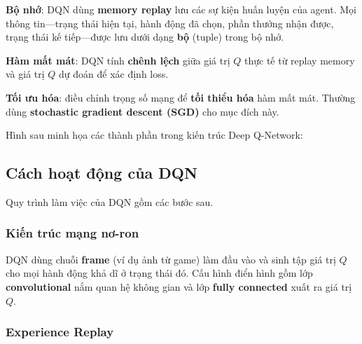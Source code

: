 \begin{phuongphap}[title={Bộ nhớ (Memory)}]
\textbf{Bộ nhớ}: DQN dùng \textbf{memory replay} lưu các sự kiện huấn luyện của agent.
Mọi thông tin---trạng thái hiện tại, hành động đã chọn, phần thưởng nhận được, trạng thái kế tiếp---được lưu dưới dạng \textbf{bộ} (tuple) trong bộ nhớ.
\end{phuongphap}

\begin{phuongphap}[title={Hàm mất mát (Loss Function)}]
\textbf{Hàm mất mát}: DQN tính \textbf{chênh lệch} giữa giá trị $Q$ thực tế từ replay memory và giá trị $Q$ dự đoán để xác định loss.
\end{phuongphap}

\begin{phuongphap}[title={Tối ưu hóa (Optimization)}]
\textbf{Tối ưu hóa}: điều chỉnh trọng số mạng để \textbf{tối thiểu hóa} hàm mất mát.
Thường dùng \textbf{stochastic gradient descent (SGD)} cho mục đích này.
\end{phuongphap}

\begin{vidu}[title={Sơ đồ kiến trúc DQN}]
Hình sau minh họa các thành phần trong kiến trúc Deep Q-Network:
\end{vidu}


\subsection{Cách hoạt động của DQN}

\begin{phuongphap}[title={Các bước vận hành}]
Quy trình làm việc của DQN gồm các bước sau.
\end{phuongphap}

\subsubsection{Kiến trúc mạng nơ-ron}

\begin{phuongphap}[title={Neural Network Architecture}]
DQN dùng chuỗi \textbf{frame} (ví dụ ảnh từ game) làm đầu vào và sinh tập giá trị $Q$ cho mọi hành động khả dĩ ở trạng thái đó.
Cấu hình điển hình gồm lớp \textbf{convolutional} nắm quan hệ không gian và lớp \textbf{fully connected} xuất ra giá trị $Q$.
\end{phuongphap}

\subsubsection{Experience Replay}

